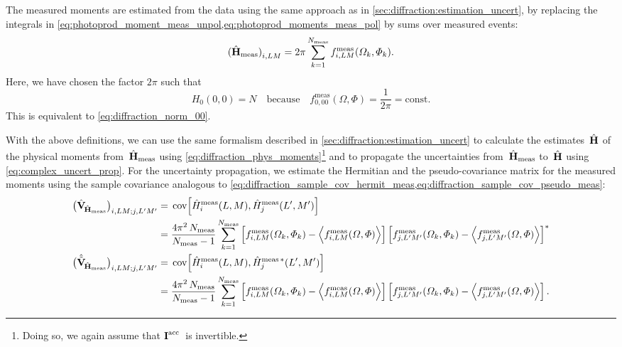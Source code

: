 The measured moments are estimated from the data using the same
approach as in \cref{sec:diffraction:estimation_uncert}, \ie by
replacing the integrals in
\cref{eq:photoprod_moment_meas_unpol,eq:photoprod_moments_meas_pol} by
sums over measured events:
\begin{equation}
  \label{eq:photoprod_moments_meas_estimate}
  \rBrk[0]{\hat{\vect{H}}_\text{meas}}_{i, L M}
  = 2 \pi \sum_{k = 1}^{N_\text{meas}} f_{i, L M}^\text{meas}(\Omega_k, \Phi_k).
\end{equation}
Here, we have chosen the factor $2 \pi$ such that
\begin{equation}
  \label{eq:photoprod_norm_00}
  H_0(0, 0)
  = N
  \quad\text{because}\quad
  f_{0, 0 0}^\text{meas}(\Omega, \Phi)
  = \frac{1}{2 \pi}
  = \text{const}.
\end{equation}
This is equivalent to \cref{eq:diffraction_norm_00}.

With the above definitions, we can use the same formalism described in
\cref{sec:diffraction:estimation_uncert} to calculate the
estimates~$\hat{\bm{\mathrm{H}}}$ of the physical moments
from~$\hat{\bm{\mathrm{H}}}_\text{meas}$ using
\cref{eq:diffraction_phys_moments}\footnote{Doing so, we again assume
that $\bm{\mathrm{I}}^\text{acc}$~is invertible.} and to propagate the
uncertainties from~$\hat{\bm{\mathrm{H}}}_\text{meas}$ to~$\hat{\bm{\mathrm{H}}}$
using \cref{eq:complex_uncert_prop}.  For the uncertainty propagation,
we estimate the Hermitian and the pseudo-covariance matrix for the
measured moments using the sample covariance analogous to
\cref{eq:diffraction_sample_cov_hermit_meas,eq:diffraction_sample_cov_pseudo_meas}:
\begin{align}
  \rBrk[1]{\hat{\covMatSym}_{\!\hat{\vect{H}}_\text{meas}}}_{i, L M; j, L' M'}
  ={}& \cov[2]{\hat{H}_i^\text{meas}(L, M), \hat{H}_j^\text{meas}(L', M')} \notag
  \\
  \label{eq:photoprod_sample_cov_hermit_meas}
  ={}& \frac{4 \pi^2\, N_\text{meas}}{N_\text{meas} - 1} \sum_{k = 1}^{N_\text{meas}}
  \sBrk[2]{f_{i, L M}^\text{meas}(\Omega_k, \Phi_k)   - \Mean{f_{i, L M}^\text{meas}(\Omega, \Phi)}}
  \sBrk[2]{f_{j, L' M'}^\text{meas}(\Omega_k, \Phi_k) - \Mean{f_{j, L' M'}^\text{meas}(\Omega, \Phi)}}^*
  \\
  \rBrk[1]{\hat{\tilde{\covMatSym}}_{\!\hat{\vect{H}}_\text{meas}}}_{i, L M; j, L' M'}
  ={}& \cov[2]{\hat{H}_i^\text{meas}(L, M), \hat{H}_j^{\text{meas}\, *}(L', M')} \notag
  \\
  \label{eq:photoprod_sample_cov_pseudo_meas}
  ={}& \frac{4 \pi^2\, N_\text{meas}}{N_\text{meas} - 1} \sum_{k = 1}^{N_\text{meas}}
  \sBrk[2]{f_{i, L M}^\text{meas}(\Omega_k, \Phi_k)   - \Mean{f_{i, L M}^\text{meas}(\Omega, \Phi)}}
  \sBrk[2]{f_{j, L' M'}^\text{meas}(\Omega_k, \Phi_k) - \Mean{f_{j, L' M'}^\text{meas}(\Omega, \Phi)}}.
\end{align}


